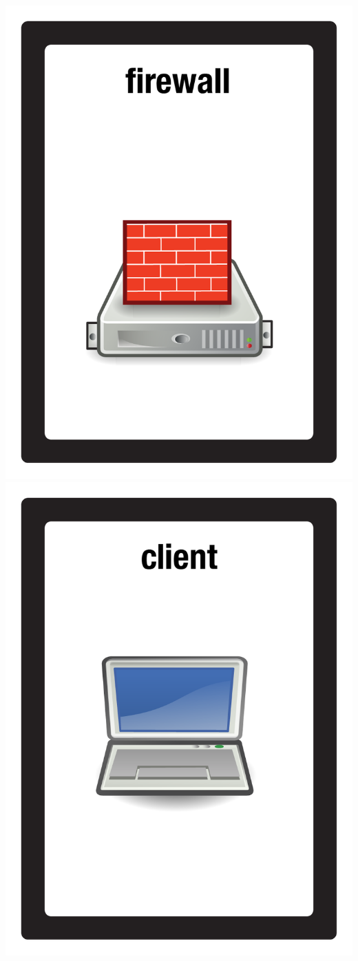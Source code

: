 \documentclass{letter}
\begin{document}
\includegraphics{patch/patch_firewall}
\includegraphics{patch/patch_client_laptop}
\end{document}

